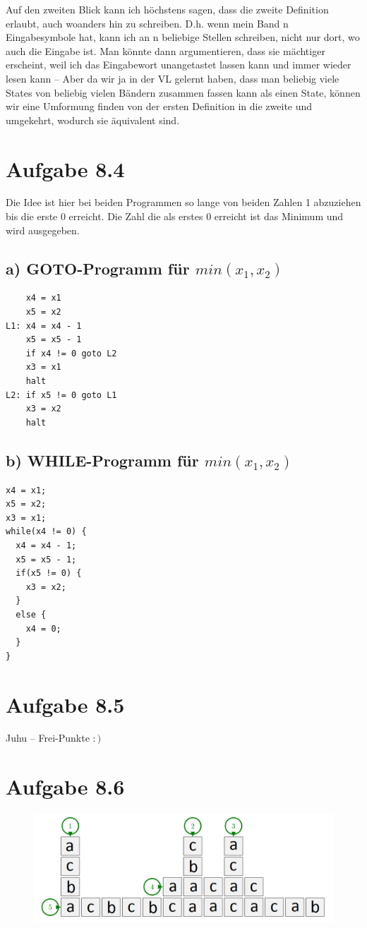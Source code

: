 \documentclass{article}
\begin{document}
Auf den zweiten Blick kann ich höchstens sagen, dass die zweite Definition erlaubt, auch woanders hin zu schreiben.
D.h. wenn mein Band n Eingabesymbole hat, kann ich an n beliebige Stellen schreiben, nicht nur dort, wo auch die Eingabe ist. Man könnte dann argumentieren, dass sie mächtiger erscheint, weil ich das Eingabewort unangetastet lassen kann und immer wieder lesen kann -- Aber da wir ja in der VL gelernt haben, dass man beliebig viele States von beliebig vielen Bändern zusammen fassen kann als einen State, können wir eine Umformung finden von der ersten Definition in die zweite und umgekehrt, wodurch sie äquivalent sind.


\section*{Aufgabe 8.4}
Die Idee ist hier bei beiden Programmen so lange von beiden Zahlen 1 abzuziehen bis die erste 0 erreicht. Die Zahl die als erstes 0 erreicht ist das Minimum und wird ausgegeben.
\subsection*{a) GOTO-Programm für $min(x_1,x_2)$}
\begin{verbatim}
    x4 = x1
    x5 = x2
L1: x4 = x4 - 1
    x5 = x5 - 1
    if x4 != 0 goto L2
    x3 = x1
    halt
L2: if x5 != 0 goto L1
    x3 = x2
    halt
\end{verbatim}
\newpage
\subsection*{b) WHILE-Programm für $min(x_1,x_2)$}
\begin{verbatim}
x4 = x1;
x5 = x2;
x3 = x1;
while(x4 != 0) {
  x4 = x4 - 1;
  x5 = x5 - 1;
  if(x5 != 0) {
    x3 = x2;
  }
  else {
    x4 = 0;
  }
}
\end{verbatim}
\section*{Aufgabe 8.5}

Juhu -- Frei-Punkte $:)$




\section*{Aufgabe 8.6}
\begin{figure}[!h]
  \includegraphics[scale=0.4]{crossword.png}
\end{figure}
\end{document}
